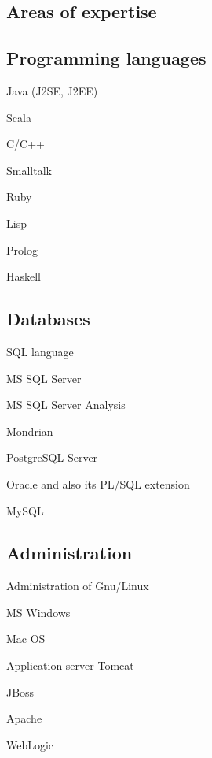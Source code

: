 \documentclass[czech]{article}
\renewenvironment{itemize}{
  \begin{list}{}{
    \setlength{\leftmargin}{1.5em}
  }
}{
  \end{list}
}
\begin{document}
\textcolor{coolblack}{\section*{Areas of expertise}}
\begin{multicols}{2} 
\textcolor{coffee}{\subsection*{Programming languages}}

\begin{itemize}
\item Java (J2SE, J2EE)
\item Scala
\item C/C++
\item Smalltalk
\item Ruby
\item Lisp
\item Prolog
\item Haskell
\end{itemize}


\textcolor{coffee}{\subsection*{Databases}}

\begin{itemize}
\item SQL language
\item MS SQL Server
\item MS SQL Server Analysis
\item Mondrian
\item PostgreSQL Server
\item Oracle and also its PL/SQL extension
\item MySQL
\end{itemize}
\end{multicols}




\textcolor{coffee}{\subsection*{Administration}}
\begin{itemize}
  \item Administration of Gnu/Linux
  
  \item MS Windows
  \item Mac OS
  
  \item Application server Tomcat
  \item JBoss
  \item Apache
  \item WebLogic 
  \item 
\end{itemize}
\end{document}
